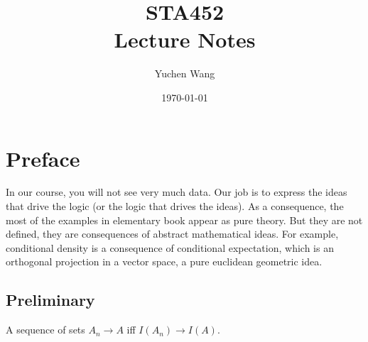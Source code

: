 \documentclass[11pt]{article}
\title{STA452\\ Lecture Notes}
\author{Yuchen Wang}
\date{\today}
\numberwithin{equation}{section}
\begin{document}
    \maketitle
    \tableofcontents
    \newpage
\section{Preface}
In our course, you will not see very much data. Our job is to express the ideas that drive the logic (or the logic that drives the ideas). As a consequence, the most of the examples in elementary book appear as pure theory. But they are not defined, they are consequences of abstract mathematical ideas.
For example, conditional density is a consequence of conditional expectation, which is an orthogonal projection in a vector space, a pure euclidean geometric idea.

\subsection{Preliminary}
A sequence of sets $A_n \rightarrow A$ iff $I(A_n) \rightarrow I(A)$.
\end{document}
